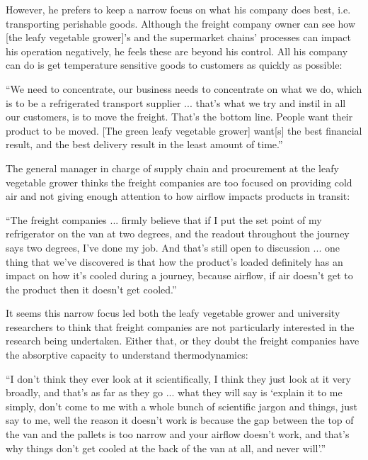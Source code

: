 However, he prefers to keep a narrow focus on what his company does best, i.e. transporting perishable goods. Although the freight company owner can see how [the leafy vegetable grower]'s and the supermarket chains' processes can impact his operation negatively, he feels these are beyond his control. All his company can do is get temperature sensitive goods to customers as quickly as possible:  

\begin{displayquote}[Participant 8/1]
\small
\enquote{We need to concentrate, our business needs to concentrate on what we do, which is to be a refrigerated transport supplier ... that's what we try and instil in all our customers, is to move the freight. That's the bottom line. People want their product to be moved. [The green leafy vegetable grower] want[s] the best financial result, and the best delivery result in the least amount of time.} 
\end{displayquote}
 

The general manager in charge of supply chain and procurement at the leafy vegetable grower thinks the freight companies are too focused on providing cold air and not giving enough attention to how airflow impacts products in transit:

\begin{displayquote}[Participant 1/1]
\small
\enquote{The freight companies ... firmly believe that if I put the set point of my refrigerator on the van at two degrees, and the readout throughout the journey says two degrees, I've done my job. And that's still open to discussion ... one thing that we've discovered is that how the product's loaded definitely has an impact on how it's cooled during a journey, because airflow, if air doesn't get to the product then it doesn't get cooled.} 
\end{displayquote}
 

It seems this narrow focus led both the leafy vegetable grower and university researchers to think that freight companies are not particularly interested in the research being undertaken. Either that, or they doubt the freight companies have the absorptive capacity to understand thermodynamics:

\begin{displayquote}[Participant 1/1]
\small
\enquote{I don't think they ever look at it scientifically, I think they just look at it very broadly, and that's as far as they go ... what they will say is \enquote{explain it to me simply, don't come to me with a whole bunch of scientific jargon and things, just say to me, well the reason it doesn't work is because the gap between the top of the van and the pallets is too narrow and your airflow doesn't work, and that's why things don't get cooled at the back of the van at all, and never will}.} 
\end{displayquote}


